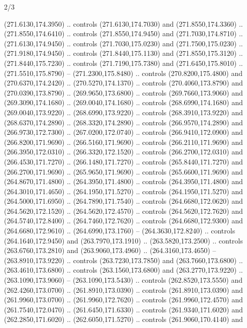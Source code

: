 \begin{flagdescription}{2/3}
\begin{scope}[xshift=0.5\flaglength,yshift=0.5\flagwidth,scale=\flagwidth/259.2]
\begin{scope}[y=0.8pt, x=0.8pt, yscale=-1,shift={(-243,-162)}]
      (271.6130,174.3950) .. controls (271.6130,174.7030) and (271.8550,174.3360) ..
      (271.8550,174.6410) .. controls (271.8550,174.9450) and (271.7030,174.8710) ..
      (271.6130,174.9450) .. controls (271.7030,175.0230) and (271.7500,175.0230) ..
      (271.9180,174.9450) .. controls (271.8440,175.1130) and (271.8550,175.3120) ..
      (271.8440,175.7230) .. controls (271.7190,175.7380) and (271.6450,175.8010) ..
      (271.5510,175.8790) -- (271.2300,175.8480) .. controls (270.8200,175.4800) and
      (270.6370,174.2420) .. (270.5270,174.1370) .. controls (270.4060,173.8790) and
      (270.0390,173.8790) .. (269.9650,173.6800) .. controls (269.7660,173.9060) and
      (269.3090,174.1680) .. (269.0040,174.1680) .. controls (268.6990,174.1680) and
      (269.0040,173.9220) .. (268.6990,173.9220) .. controls (268.3910,173.9220) and
      (268.6370,174.2890) .. (268.3320,174.2890) .. controls (266.9570,174.2890) and
      (266.9730,172.7300) .. (267.0200,172.0740) .. controls (266.9410,172.0900) and
      (266.8200,171.9690) .. (266.5160,171.9690) .. controls (266.2110,171.9690) and
      (266.3950,172.0310) .. (266.3320,172.1520) .. controls (266.2700,172.0310) and
      (266.4530,171.7270) .. (266.1480,171.7270) .. controls (265.8440,171.7270) and
      (266.2700,171.9690) .. (265.9650,171.9690) .. controls (265.6600,171.9690) and
      (264.8670,171.4800) .. (264.3950,171.4800) .. controls (264.3950,171.4800) and
      (264.3010,171.4650) .. (264.1950,171.5270) .. controls (264.1950,171.5270) and
      (264.5000,171.6950) .. (264.7890,171.7540) .. controls (264.6680,172.0620) and
      (264.5620,172.1520) .. (264.5620,172.4570) .. controls (264.5620,172.7620) and
      (264.5740,172.8400) .. (264.7460,172.7620) .. controls (264.6680,172.9300) and
      (264.6680,172.9610) .. (264.6990,173.1760) -- (264.3630,172.8240) .. controls
      (264.1640,172.9450) and (263.7970,173.1910) .. (263.5820,173.2500) .. controls
      (263.6760,173.2810) and (263.9060,173.4960) .. (264.3160,173.4650) --
      (263.8910,173.9220) .. controls (263.7230,173.7850) and (263.7660,173.6800) ..
      (263.4610,173.6800) .. controls (263.1560,173.6800) and (263.2770,173.9220) ..
      (263.1090,173.9060) -- (263.1090,173.5430) .. controls (262.8520,173.5550) and
      (262.4260,173.0700) .. (261.8910,173.0390) .. controls (261.8910,173.0390) and
      (261.9960,173.0700) .. (261.9960,172.7620) .. controls (261.9960,172.4570) and
      (261.7540,172.0470) .. (261.6450,171.6330) .. controls (261.9340,171.6020) and
      (262.2850,171.6020) .. (262.6050,171.5270) .. controls (261.9060,170.4140) and

\end{scope}
\end{scope}
\end{flagdescription}
